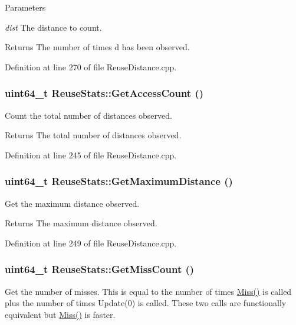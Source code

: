 \begin{DoxyParams}{Parameters}
\item[{\em dist}]The distance to count.\end{DoxyParams}
\begin{DoxyReturn}{Returns}
The number of times d has been observed. 
\end{DoxyReturn}


Definition at line 270 of file ReuseDistance.cpp.\hypertarget{class_reuse_stats_a48935d131ce635b1b37b2a43f0c52217}{
\subsubsection[{GetAccessCount}]{\setlength{\rightskip}{0pt plus 5cm}uint64\_\-t ReuseStats::GetAccessCount ()}}
\label{class_reuse_stats_a48935d131ce635b1b37b2a43f0c52217}
Count the total number of distances observed.

\begin{DoxyReturn}{Returns}
The total number of distances observed. 
\end{DoxyReturn}


Definition at line 245 of file ReuseDistance.cpp.\hypertarget{class_reuse_stats_ac70175a532ea2dc608e0fd2f04e4fcbb}{
\subsubsection[{GetMaximumDistance}]{\setlength{\rightskip}{0pt plus 5cm}uint64\_\-t ReuseStats::GetMaximumDistance ()}}
\label{class_reuse_stats_ac70175a532ea2dc608e0fd2f04e4fcbb}
Get the maximum distance observed.

\begin{DoxyReturn}{Returns}
The maximum distance observed. 
\end{DoxyReturn}


Definition at line 249 of file ReuseDistance.cpp.\hypertarget{class_reuse_stats_aeff4f3fe0f2253e1aed432b18ec85d85}{
\subsubsection[{GetMissCount}]{\setlength{\rightskip}{0pt plus 5cm}uint64\_\-t ReuseStats::GetMissCount ()}}
\label{class_reuse_stats_aeff4f3fe0f2253e1aed432b18ec85d85}
Get the number of misses. This is equal to the number of times \hyperlink{class_reuse_stats_a3d963a3b6c2c0b37b23d4e0723a70831}{Miss()} is called plus the number of times Update(0) is called. These two calls are functionally equivalent but \hyperlink{class_reuse_stats_a3d963a3b6c2c0b37b23d4e0723a70831}{Miss()} is faster. 

